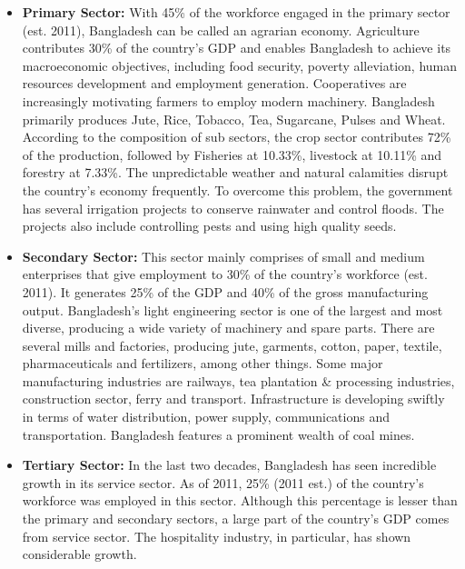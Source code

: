 \begin{itemize}
	\item\textbf{ Primary Sector: }
	With 45\% of the workforce engaged in the primary sector (est. 2011), Bangladesh can be called 
	an agrarian economy. Agriculture contributes 30\% of the country's GDP and enables Bangladesh 
	to achieve its macroeconomic objectives, including food security, poverty alleviation, human 
	resources development and employment generation. Cooperatives are increasingly motivating farmers 
	to employ modern machinery. Bangladesh primarily produces Jute, Rice, Tobacco, Tea, Sugarcane, 
	Pulses and Wheat. According to the composition of sub sectors, the crop sector contributes 72\% of 
	the production, followed by Fisheries at 10.33\%, livestock at 10.11\% and forestry at 7.33\%. 
	The unpredictable weather and natural calamities disrupt the country's economy frequently. 
	To overcome this problem, the government has several irrigation projects to conserve rainwater 
	and control floods. The projects also include controlling pests and using high quality seeds. 

	\item\textbf{Secondary Sector: }
	This sector mainly comprises of small and medium enterprises that give employment to 30\% of 
	the country's workforce (est. 2011). It generates 25\% of the GDP and 40\% of the gross 
	manufacturing output. Bangladesh's light engineering sector is one of the largest and most diverse, 
	producing a wide variety of machinery and spare parts. There are several mills and factories, 
	producing jute, garments, cotton, paper, textile, pharmaceuticals and fertilizers, 
	among other things. Some major manufacturing industries are railways, tea plantation \& processing 
	industries, construction sector, ferry and transport. Infrastructure is developing swiftly 
	in terms of water distribution, power supply, communications and transportation. 
	Bangladesh features a prominent wealth of coal mines. 
 
 \item\textbf{Tertiary Sector: }
 In the last two decades, Bangladesh has seen incredible growth in its service sector. 
 As of 2011, 25\% (2011 est.) of the country's workforce was employed in this sector. 
 Although this percentage is lesser than the primary and secondary sectors, 
 a large part of the country's GDP comes from service sector. The hospitality industry, in particular, has shown considerable growth.

\end{itemize}

